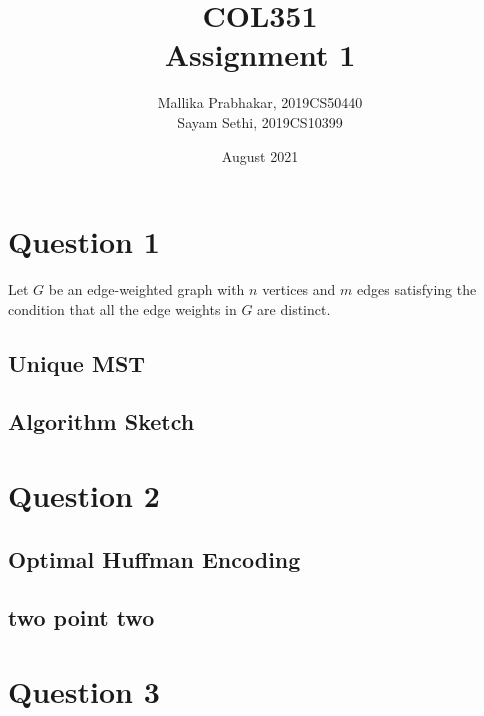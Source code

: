 \documentclass[12pt]{article}
\title{COL351 \\ Assignment 1}
\author{Mallika Prabhakar, 2019CS50440 \\ Sayam Sethi, 2019CS10399}
\date{August 2021}
\begin{document}

\maketitle
\tableofcontents
{}


\section{Question 1}

Let $G$ be an edge-weighted graph with $n$ vertices and $m$ edges satisfying the condition that all the edge weights in $G$ are distinct.

\subsection{Unique MST}


\subsection{Algorithm Sketch}



\section{Question 2}

\subsection{Optimal Huffman Encoding}


\subsection{two point two}


\section{Question 3}
\end{document}
